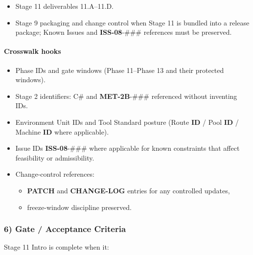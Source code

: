 \documentclass[10pt]{article}
\begin{document}
\begin{itemize}
\item Stage 11 deliverables 11.A–11.D.
\item Stage 9 packaging and change control when Stage 11 is bundled into a release package; Known Issues and \textbf{ISS-08}-### references must be preserved.
\end{itemize}

\paragraph*{Crosswalk hooks}

\begin{itemize}
\item Phase IDs and gate windows (Phase 11–Phase 13 and their protected windows).
\item Stage 2 identifiers: C# and \textbf{MET-2B}-### referenced without inventing IDs.
\item Environment Unit IDs and Tool Standard posture (Route \textbf{ID} / Pool \textbf{ID} / Machine \textbf{ID} where applicable).
\item Issue IDs \textbf{ISS-08}-### where applicable for known constraints that affect feasibility or admissibility.
\item Change-control references:
\begin{itemize}
\item \textbf{PATCH} and \textbf{CHANGE-LOG} entries for any controlled updates,
\item freeze-window discipline preserved.
\end{itemize}
\end{itemize}

\subsubsection*{6) Gate / Acceptance Criteria}

Stage 11 Intro is complete when it:
\end{document}
